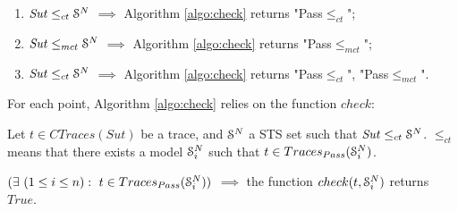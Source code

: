 \begin{enumerate}
    \item $\mathit{Sut} \leq_{ct} \EuScript{S}^N$ $\implies$
        Algorithm \ref{algo:check} returns "Pass$\leq_{ct}$";

    \item $\mathit{Sut} \leq_{mct} \EuScript{S}^N$ $\implies$
        Algorithm \ref{algo:check} returns "Pass$\leq_{mct}$";

    \item $\mathit{Sut} \leq_{ct} \EuScript{S}^N$ $\implies$
        Algorithm \ref{algo:check} returns "Pass$\leq_{ct}$",
        "Pass$\leq_{mct}$".
\end{enumerate}

For each point, Algorithm \ref{algo:check} relies on the
function $check$:

\begin{proposition}
    Let $t \in CTraces(Sut)$ be a trace, and $\EuScript{S}^{N}$ a
    STS set such that $\mathit{Sut} \leq_{ct} \EuScript{S}^{N}$.
    $\leq_{ct}$ means that there exists a model
    $\EuScript{S}_i^{N}$ such that $t \in
    Traces_{Pass}(\EuScript{S}_i^{N})$.

    $(\exists ~(1 \leq i \leq n) : ~t \in
    Traces_{Pass}(\EuScript{S}_i^{N}))$ $\implies$ the function
    $check(t, \EuScript{S}_i^{N})$ returns $True$.

    \label{prop:check}
\end{proposition}

